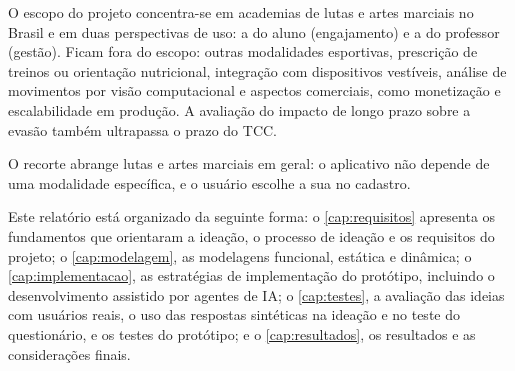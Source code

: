 O escopo do projeto concentra-se em academias de lutas e artes marciais
no Brasil e em duas perspectivas de uso: a do aluno (engajamento) e a do
professor (gestão). Ficam fora do escopo: outras modalidades esportivas,
prescrição de treinos ou orientação nutricional, integração com
dispositivos vestíveis, análise de movimentos por visão computacional e
aspectos comerciais, como monetização e escalabilidade em produção. A
avaliação do impacto de longo prazo sobre a evasão também ultrapassa o
prazo do TCC.

O recorte abrange lutas e artes marciais em geral: o aplicativo não depende de
uma modalidade específica, e o usuário escolhe a sua no cadastro.

Este relatório está organizado da seguinte forma: o
\autoref{cap:requisitos} apresenta os fundamentos que orientaram a
ideação, o processo de ideação e os requisitos do projeto; o
\autoref{cap:modelagem}, as modelagens funcional, estática e dinâmica; o
\autoref{cap:implementacao}, as estratégias de implementação do
protótipo, incluindo o desenvolvimento assistido por agentes de IA; o \autoref{cap:testes}, a avaliação das
ideias com usuários reais, o uso das respostas sintéticas na ideação e no
teste do questionário, e os testes do protótipo; e o \autoref{cap:resultados}, os resultados e as
considerações finais.